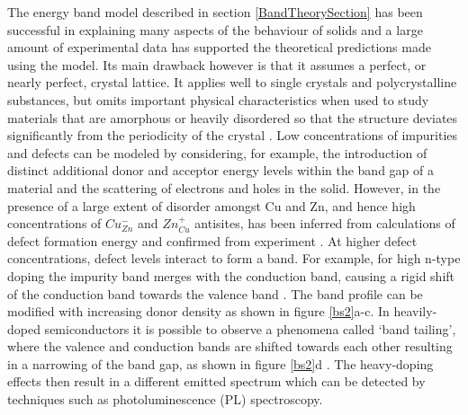 \documentclass[11pt, twoside]{report}
\begin{document}
The energy band model described in section \ref{BandTheorySection} has been successful in explaining many aspects of the behaviour of solids and a large amount of experimental data has supported the theoretical predictions made using the model. Its main drawback however is that it assumes a perfect, or nearly perfect, crystal lattice. It applies well to single crystals and polycrystalline substances, but omits important physical characteristics when used to study materials that are amorphous or heavily disordered so that the structure deviates significantly from the periodicity of the crystal \cite{small_semiconductor1}.
Low concentrations of impurities and defects can be modeled by considering, for example, the introduction of distinct additional donor and acceptor energy levels within the band gap of a material and the scattering of electrons and holes in the solid. However, in {\CZTS} the presence of a large extent of disorder amongst Cu and Zn, and hence high concentrations of $Cu_{Zn}^{-}$ and $Zn_{Cu}^{+}$ antisites, has been inferred from calculations of defect formation energy \cite{defects_Chen} and confirmed from experiment \cite{Schorr, CZTS_Xray, CZTS_TEM}. 
At higher defect concentrations, defect levels interact to form a band. For example, for high n-type doping the impurity band merges with the conduction band, causing a rigid shift of the conduction band towards the valence band \cite{Pankove}. The band profile can be modified with increasing donor density as shown in figure \ref{bs2}a-c. 
In heavily-doped semiconductors it is possible to observe a phenomena called `band tailing', where the valence and conduction bands are shifted towards each other resulting in a narrowing of the band gap, as shown in figure \ref{bs2}d \cite{Pankove}. The heavy-doping effects then result in a different emitted spectrum which can be detected by techniques such as photoluminescence (PL) spectroscopy. 
\end{document}
